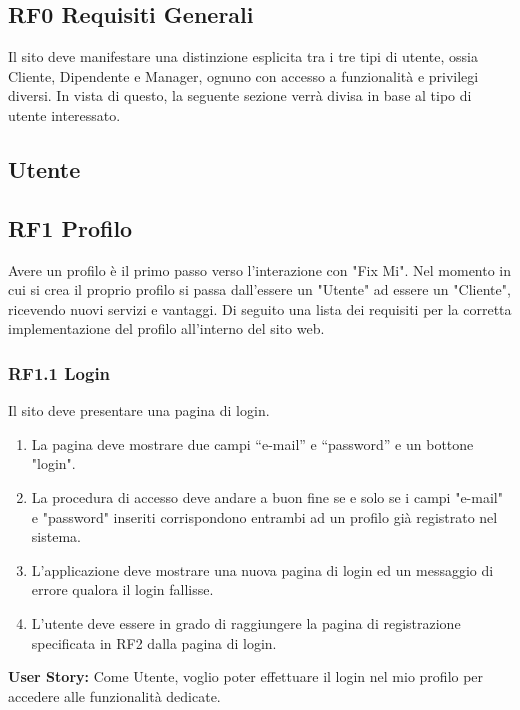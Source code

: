 \documentclass{report}
\begin{document}
\subsection*{RF0 Requisiti Generali}
Il sito deve manifestare una distinzione esplicita tra i tre tipi di utente, ossia Cliente, Dipendente e Manager, ognuno con accesso a funzionalità e privilegi diversi.
In vista di questo, la seguente sezione verrà divisa in base al tipo di utente interessato.

\subsection{Utente}

\subsection*{RF1 Profilo}

Avere un profilo è il primo passo verso l'interazione con "Fix Mi". Nel momento in cui si crea il proprio profilo si passa dall'essere un "Utente" ad essere un "Cliente", ricevendo nuovi servizi e vantaggi. Di seguito una lista dei requisiti per la corretta implementazione del profilo all'interno del sito web.

\subsubsection*{RF1.1 Login}

Il sito deve presentare una pagina di login.

\begin{enumerate}
	\item La pagina deve mostrare due campi “e-mail” e “password” e un bottone "login".
	
	\item La procedura di accesso deve andare a buon fine se e solo se i campi "e-mail" e "password" inseriti corrispondono entrambi ad un profilo già registrato nel sistema.
	
	\item L'applicazione deve mostrare una nuova pagina di login ed un messaggio di errore qualora il login fallisse.
	
	\item L’utente deve essere in grado di raggiungere la pagina di registrazione specificata in RF2 dalla pagina di login.
\end{enumerate}


\textbf{User Story:}
Come Utente, voglio poter effettuare il login nel mio profilo per accedere alle funzionalità dedicate.
\end{document}
